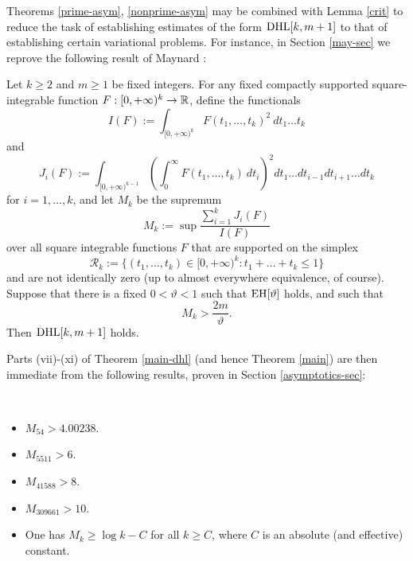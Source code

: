 Theorems \ref{prime-asym}, \ref{nonprime-asym} may be combined with Lemma \ref{crit} to reduce the task of establishing estimates of the form $\operatorname*{DHL}[k,m+1]$ to that of establishing certain variational problems.  For instance, in Section \ref{may-sec} we reprove the following result of Maynard \cite[Proposition 4.2]{maynard-new}:

\begin{theorem}\label{maynard-thm}  Let $k \geq 2$ and $m \geq 1$ be fixed integers. For any fixed compactly supported square-integrable function $F: [0,+\infty)^k \to \mathbb{R}$, define the functionals
\begin{equation}\label{i-def}
I(F) := \int_{[0,+\infty)^k} F(t_1,\dots,t_k)^2\ dt_1 \dots t_k
\end{equation}
and
\begin{equation}\label{ji-def}
 J_i(F) := \int_{[0,+\infty)^{k-1}} \left(\int_0^\infty F(t_1,\dots,t_k)\ dt_i\right)^2 dt_1 \dots dt_{i-1} dt_{i+1} \dots dt_k
\end{equation}
for $i=1,\dots,k$, and let $M_k$ be the supremum
\begin{equation}\label{mk4}
 M_k := \sup \frac{\sum_{i=1}^k J_i(F)}{I(F)}
\end{equation}
over all square integrable functions $F$ that are supported on the simplex
$$ {\mathcal R}_k := \{ (t_1,\dots,t_k) \in [0,+\infty)^k: t_1+\dots+t_k \leq 1 \}$$
and are not identically zero (up to almost everywhere equivalence, of course).  Suppose that there is a fixed $0 < \vartheta < 1$ such that $\operatorname*{EH}[\vartheta]$ holds, and such that
$$ M_k > \frac{2m}{\vartheta}.$$
Then $\operatorname*{DHL}[k,m+1]$ holds.
\end{theorem}

Parts (vii)-(xi) of Theorem \ref{main-dhl} (and hence Theorem \ref{main}) are then immediate from the following results, proven in Section \ref{asymptotics-sec}:

\begin{theorem}\label{mlower}\
\begin{itemize}
\item[(vii)] $M_{54} > 4.00238$.
\item[(viii)] $M_{5511} > 6$.
\item[(ix)] $M_{41588} > 8$.
\item[(x)] $M_{309661} > 10$.
\item[(xi)] One has $M_k \geq \log k - C$ for all $k \geq C$, where $C$ is an absolute (and effective) constant.
\end{itemize}
\end{theorem}

